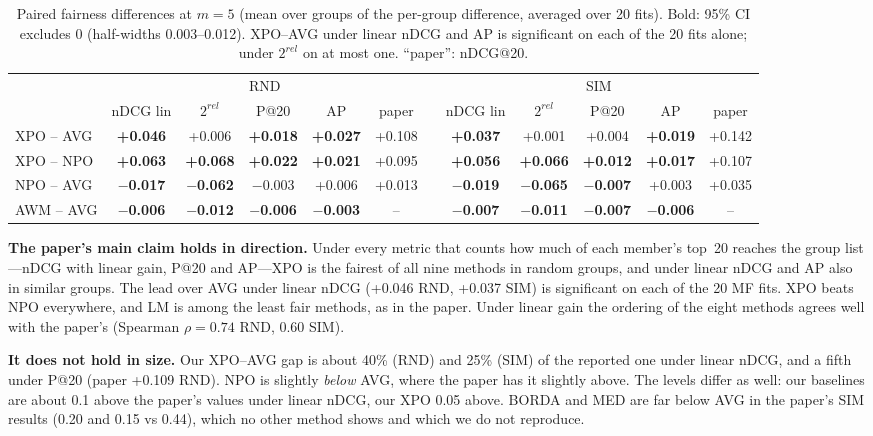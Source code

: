\documentclass[11pt,a4paper]{article}
\newcommand{\npo}{NPO}
\newcommand{\xpo}{XPO}
\newcommand{\B}[1]{\textbf{#1}}
\begin{document}
\begin{table}[t]
\centering\footnotesize
\setlength{\tabcolsep}{3.4pt}
\begin{tabular}{l ccccc c ccccc}
\toprule
 & \multicolumn{5}{c}{RND} && \multicolumn{5}{c}{SIM}\\
\cmidrule{2-6}\cmidrule{8-12}
 & nDCG lin & $2^{rel}$ & P@20 & AP & paper && nDCG lin & $2^{rel}$ & P@20 & AP & paper\\
\midrule
\xpo{} -- AVG & \B{+0.046} & +0.006 & \B{+0.018} & \B{+0.027} & +0.108 && \B{+0.037} & +0.001 & +0.004 & \B{+0.019} & +0.142\\
\xpo{} -- \npo{} & \B{+0.063} & \B{+0.068} & \B{+0.022} & \B{+0.021} & +0.095 && \B{+0.056} & \B{+0.066} & \B{+0.012} & \B{+0.017} & +0.107\\
\npo{} -- AVG & \B{$-$0.017} & \B{$-$0.062} & $-$0.003 & +0.006 & +0.013 && \B{$-$0.019} & \B{$-$0.065} & \B{$-$0.007} & +0.003 & +0.035\\
AWM -- AVG & \B{$-$0.006} & \B{$-$0.012} & \B{$-$0.006} & \B{$-$0.003} & -- && \B{$-$0.007} & \B{$-$0.011} & \B{$-$0.007} & \B{$-$0.006} & --\\
\bottomrule
\end{tabular}
\caption{Paired fairness differences at $m=5$ (mean over groups of the per-group
difference, averaged over 20 fits). Bold: 95\% CI excludes 0 (half-widths
0.003--0.012). \xpo{}--AVG under linear nDCG and AP is significant on each of
the 20 fits alone; under $2^{rel}$ on at most one. ``paper'': nDCG@20.}
\label{tab:diff}
\end{table}

\textbf{The paper's main claim holds in direction.} Under every metric that
counts how much of each member's top~20 reaches the group list---nDCG with
linear gain, P@20 and AP---\xpo{} is the fairest of all nine methods in random
groups, and under linear nDCG and AP also in similar groups. The lead over AVG
under linear nDCG (+0.046 RND, +0.037 SIM) is significant on each of the 20 MF
fits. \xpo{} beats \npo{} everywhere, and LM is among the least fair methods,
as in the paper. Under linear gain the ordering of the eight methods agrees
well with the paper's (Spearman $\rho=0.74$ RND, 0.60 SIM).

\textbf{It does not hold in size.} Our \xpo{}--AVG gap is about 40\% (RND) and
25\% (SIM) of the reported one under linear nDCG, and a fifth under P@20 (paper
+0.109 RND). \npo{} is slightly \emph{below} AVG, where the paper has it
slightly above. The levels differ as well: our baselines are about 0.1 above
the paper's values under linear nDCG, our \xpo{} 0.05 above. BORDA and MED are
far below AVG in the paper's SIM results (0.20 and 0.15 vs 0.44), which no
other method shows and which we do not reproduce.
\end{document}
